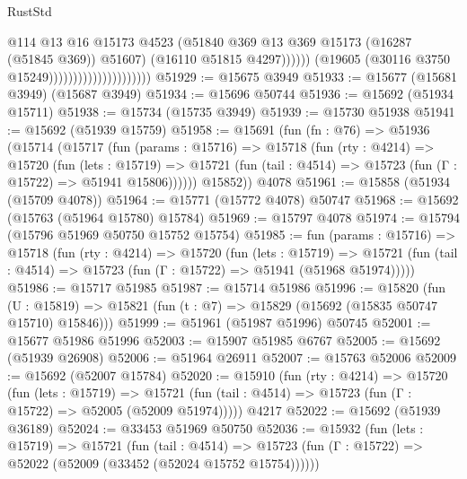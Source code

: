 \begin{lexlean}{RustStd}
\begin{coremodule}
                                                    @114
                                                    @13
                                                    @16
                                                    @15173
                                                    @4523
                                                    (@51840
                                                      @369
                                                      @13
                                                      @369
                                                      @15173
                                                      (@16287 (@51845 @369))
                                                      @51607)
                                                    (@16110 @51815 @4297))))))
                                          (@19605 (@30116 @3750 @15249)))))))))))))))))))))
@51929 := @15675 @3949
@51933 := @15677 (@15681 @3949) (@15687 @3949)
@51934 := @15696 @50744
@51936 := @15692 (@51934 @15711)
@51938 := @15734 (@15735 @3949)
@51939 := @15730 @51938
@51941 := @15692 (@51939 @15759)
@51958 := @15691
    (fun (fn : @76) =>
    @51936
      (@15714
        (@15717
          (fun (params : @15716) =>
          @15718
            (fun (rty : @4214) =>
            @15720
              (fun (lets : @15719) =>
              @15721 (fun (tail : @4514) => @15723 (fun (Γ : @15722) => @51941 @15806))))))
        @15852))
    @4078
@51961 := @15858 (@51934 (@15709 @4078))
@51964 := @15771 (@15772 @4078) @50747
@51968 := @15692 (@15763 (@51964 @15780) @15784)
@51969 := @15797 @4078
@51974 := @15794 (@15796 @51969 @50750 @15752 @15754)
@51985 := fun (params : @15716) =>
  @15718
    (fun (rty : @4214) =>
    @15720
      (fun (lets : @15719) =>
      @15721 (fun (tail : @4514) => @15723 (fun (Γ : @15722) => @51941 (@51968 @51974)))))
@51986 := @15717 @51985
@51987 := @15714 @51986
@51996 := @15820
    (fun (U : @15819) => @15821 (fun (t : @7) => @15829 (@15692 (@15835 @50747 @15710) @15846)))
@51999 := @51961 (@51987 @51996) @50745
@52001 := @15677 @51986 @51996
@52003 := @15907 @51985 @6767
@52005 := @15692 (@51939 @26908)
@52006 := @51964 @26911
@52007 := @15763 @52006
@52009 := @15692 (@52007 @15784)
@52020 := @15910
    (fun (rty : @4214) =>
    @15720
      (fun (lets : @15719) =>
      @15721 (fun (tail : @4514) => @15723 (fun (Γ : @15722) => @52005 (@52009 @51974)))))
    @4217
@52022 := @15692 (@51939 @36189)
@52024 := @33453 @51969 @50750
@52036 := @15932
    (fun (lets : @15719) =>
    @15721
      (fun (tail : @4514) =>
      @15723 (fun (Γ : @15722) => @52022 (@52009 (@33452 (@52024 @15752 @15754))))))

\end{coremodule}
\end{lexlean}
